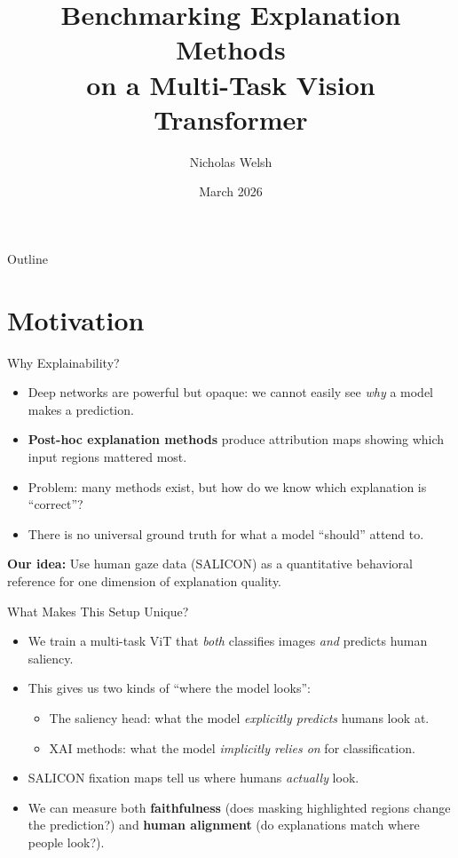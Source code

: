\documentclass{beamer}
\title[XAI Benchmarking]{Benchmarking Explanation Methods\\on a Multi-Task Vision Transformer}
\author{Nicholas Welsh}
\institute{Florida Institute of Technology\\Department of Computer Science \& Mathematics}
\date{March 2026}
\begin{document}
\begin{frame}
  \titlepage
\end{frame}

\begin{frame}{Outline}
  \tableofcontents
\end{frame}

\section{Motivation}

\begin{frame}{Why Explainability?}
\begin{itemize}
  \item Deep networks are powerful but opaque: we cannot easily see \emph{why} a model makes a prediction.
  \item \textbf{Post-hoc explanation methods} produce attribution maps showing which input regions mattered most.
  \item Problem: many methods exist, but how do we know which explanation is ``correct''?
  \item There is no universal ground truth for what a model ``should'' attend to.
\end{itemize}
\vfill
\textbf{Our idea:} Use human gaze data (SALICON) as a quantitative behavioral reference for one dimension of explanation quality.
\end{frame}

\begin{frame}{What Makes This Setup Unique?}
\begin{itemize}
  \item We train a multi-task ViT that \emph{both} classifies images \emph{and} predicts human saliency.
  \item This gives us two kinds of ``where the model looks'':
  \begin{itemize}
    \item The saliency head: what the model \emph{explicitly predicts} humans look at.
    \item XAI methods: what the model \emph{implicitly relies on} for classification.
  \end{itemize}
  \item SALICON fixation maps tell us where humans \emph{actually} look.
  \item We can measure both \textbf{faithfulness} (does masking highlighted regions change the prediction?) and \textbf{human alignment} (do explanations match where people look?).
\end{itemize}
\end{frame}
\end{document}
